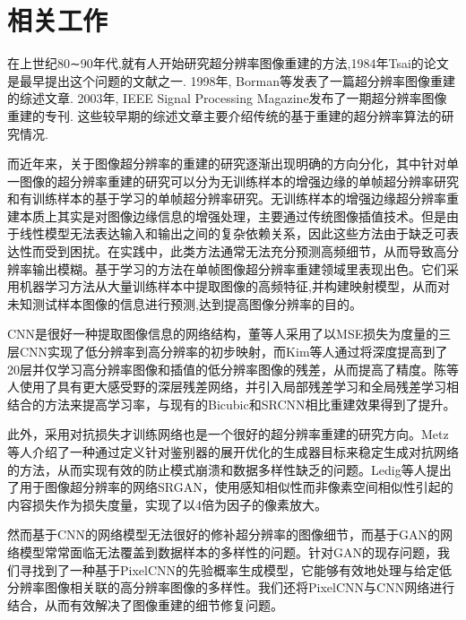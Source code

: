 \section{相关工作}
在上世纪80∼90年代,就有人开始研究超分辨率图像重建的方法,1984年Tsai的论文\cite{tsai1984multiframe}是最早提出这个问题的文献之一. 1998年, Borman等\cite{borman1998spatial}发表了一篇超分辨率图像重建的综述文章. 2003年, IEEE Signal Processing Magazine发布了一期超分辨率图像重建的专刊\cite{park2003super}. 这些较早期的综述文章主要介绍传统的基于重建的超分辨率算法的研究情况.

而近年来，关于图像超分辨率的重建的研究逐渐出现明确的方向分化，其中针对单一图像的超分辨率重建的研究可以分为无训练样本的增强边缘的单帧超分辨率研究和有训练样本的基于学习的单帧超分辨率研究\cite{Su2013review}。无训练样本的增强边缘超分辨率重建本质上其实是对图像边缘信息的增强处理，主要通过传统图像插值技术。但是由于线性模型无法表达输入和输出之间的复杂依赖关系，因此这些方法由于缺乏可表达性而受到困扰。在实践中，此类方法通常无法充分预测高频细节，从而导致高分辨率输出模糊。基于学习的方法在单帧图像超分辨率重建领域里表现出色。它们采用机器学习方法从大量训练样本中提取图像的高频特征,并构建映射模型，从而对未知测试样本图像的信息进行预测,达到提高图像分辨率的目的。

CNN是很好一种提取图像信息的网络结构，董等人\cite{dong2015image}采用了以MSE损失为度量的三层CNN实现了低分辨率到高分辨率的初步映射，而Kim等人\cite{kim2016accurate}通过将深度提高到了20层并仅学习高分辨率图像和插值的低分辨率图像的残差，从而提高了精度。陈等人\cite{Chen2020Res}使用了具有更大感受野的深层残差网络，并引入局部残差学习和全局残差学习相结合的方法来提高学习率，与现有的Bicubic和SRCNN相比重建效果得到了提升。

此外，采用对抗损失才训练网络也是一个很好的超分辨率重建的研究方向。Metz等人\cite{metz2016unrolled}介绍了一种通过定义针对鉴别器的展开优化的生成器目标来稳定生成对抗网络的方法，从而实现有效的防止模式崩溃和数据多样性缺乏的问题。Ledig等人\cite{ledig2017photo}提出了用于图像超分辨率的网络SRGAN，使用感知相似性而非像素空间相似性引起的内容损失作为损失度量，实现了以4倍为因子的像素放大。

然而基于CNN的网络模型无法很好的修补超分辨率的图像细节，而基于GAN的网络模型常常面临无法覆盖到数据样本的多样性的问题。针对GAN的现存问题，我们寻找到了一种基于PixelCNN的先验概率生成模型\cite{oord2016pixel,van2016conditional}，它能够有效地处理与给定低分辨率图像相关联的高分辨率图像的多样性。我们还将PixelCNN与CNN网络进行结合，从而有效解决了图像重建的细节修复问题。